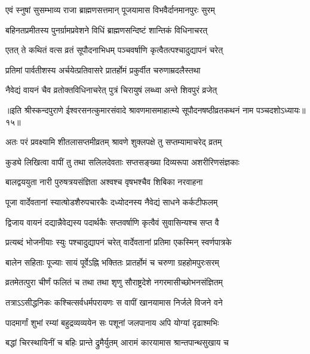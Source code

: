 \twolineshloka
{एवं स्नुषां सुसम्भाव्य राजा ब्राह्मणसत्तमान्}
{पूजयामास विभवैर्दानमानपुरः सुरम्} %

\twolineshloka
{बहिनतप्रमीतस्य पुनर्ग्रामप्रवेशने}
{विधिं ब्राह्मणसन्दिष्टं शान्तिकं विधिनाचरत्} %

\twolineshloka
{एतत् ते कथितं वत्स व्रतं सूपौदनाभिधम्}
{पञ्चवर्षाणि कृत्वैतत्पश्चादुद्यापनं चरेत्} %

\twolineshloka
{प्रतिमां पार्वतीशस्य अर्चयेत्प्रतिवासरे}
{प्रातर्होमं प्रकुर्वीत चरुणाम्रदलैस्तथा} %

\twolineshloka
{नैवेद्यं वायनं चैव व्रतोक्तविधिनाचरेत्}
{पुत्रं चिरायुषं लब्ध्वा अन्ते शिवपुरं व्रजेत्} %


{॥इति श्रीस्कन्दपुराणे ईश्वरसनत्कुमारसंवादे श्रावणमासमाहात्म्ये सूपौदनषष्ठीव्रतकथनं नाम पञ्चदशोऽध्यायः॥१५॥}





\twolineshloka
{अतः परं प्रवक्ष्यामि शीतलासप्तमीव्रतम्}
{श्रावणे शुक्लपक्षे तु सप्तम्यामाचरेद् व्रतम्} %

\twolineshloka
{कुड्ये लिखित्वा वापीं तु तथा सलिलदेवताः}
{सप्तसङ्ख्या दिव्यरूपा अशरीरिणसंज्ञकाः} %

\twolineshloka
{बालद्वययुता नारी पुरुषत्रयसंज्ञिता}
{अश्वश्च वृषभश्चैव शिबिका नरवाहना} %

\twolineshloka
{पूजा वार्देवतानां स्यात्षोडशैरुपचारकैः}
{दध्योदनस्य नैवेद्यं साधने कर्कटीफलम्} %

\twolineshloka
{द्विजाय वायनं दद्यान्नैवेद्यस्य पदार्थकैः}
{सप्तवर्षाणि कृत्वैवं सुवासिन्यश्च सप्त वै} %

\twolineshloka
{प्रत्यब्दं भोजनीयाः स्युः पश्चादुद्यापनं चरेत्}
{वार्देवतानां प्रतिमा एकस्मिन् स्वर्णपात्रके} %

\twolineshloka
{बालेन सहिताः पूज्याः सायं पूर्वेऽह्नि भक्तितः}
{प्रातर्होमं च चरुणा ग्रहहोमपुरःसरम्} %

\twolineshloka
{व्रतमेतत्पुरा चीर्णं फलितं च तथा तथा शृणु}
{सौराष्ट्रदेशे नगरमासीच्छोभनसंज्ञितम्} %

\twolineshloka
{तत्राऽऽसीद्धनिकः कश्चित्सर्वधर्मपरायणः}
{स वापीं खानयामास निर्जले विजने वने} %

\twolineshloka
{पादमार्गां शुभां रम्यां बहुद्रव्यव्ययेन सः}
{पशूनां जलपानाय अपि योग्यां दृढाश्मभिः} %

\twolineshloka
{बद्धां चिरस्थायिनीं च बहिः प्रान्ते द्रुमैर्युतम्}
{आरामं कारयामास श्रान्तपान्थसुखाय च} %


